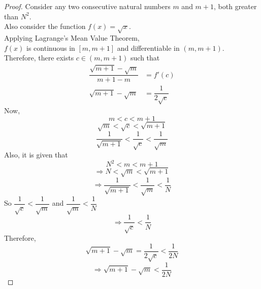 \documentclass[14]{article}
\theoremstyle{definition}
\begin{document}
\begin{proof}
Consider any two consecutive natural numbers $m$ and $m + 1$, both greater than $N^2$.\\
Also consider the function $f(x) = \sqrt{x}$.\\
Applying Lagrange's Mean Value Theorem,\\
$f(x)$ is continuous in $[m, m + 1]$ and differentiable in $(m, m + 1)$.\\
Therefore, there exists $c \in (m, m+1)$ such that
\begin{align*}
\dfrac{\sqrt{m + 1} - \sqrt{m}}{m + 1 - m} &= f'(c)\\
\sqrt{m + 1} - \sqrt{m} &= \dfrac{1}{2\sqrt{c}}
\end{align*}
Now,
\[m < c < m + 1\]
\[\sqrt{m} < \sqrt{c} < \sqrt{m + 1}\]
\[\dfrac1{\sqrt{m + 1}} < \dfrac{1}{\sqrt{c}} < \dfrac1{\sqrt{m}}\]
Also, it is given that
\[N^2 < m < m + 1\]
\[\Rightarrow N < \sqrt{m} < \sqrt{m + 1}\]
\[\Rightarrow\dfrac1{\sqrt{m + 1}} < \dfrac1{\sqrt{m}} < \dfrac{1}{N}\]
So $\dfrac1{\sqrt{c}} < \dfrac1{\sqrt{m}}$ and $\dfrac{1}{\sqrt{m}} < \dfrac1{N}$
\[\Rightarrow \dfrac1{\sqrt{c}} < \dfrac1{N}\]
Therefore,
\[\sqrt{m + 1} - \sqrt{m} = \dfrac{1}{2\sqrt{c}} < \dfrac{1}{2N}\]
\[\Rightarrow\sqrt{m + 1} - \sqrt{m} < \dfrac{1}{2N}\]
\end{proof}
\end{document}
